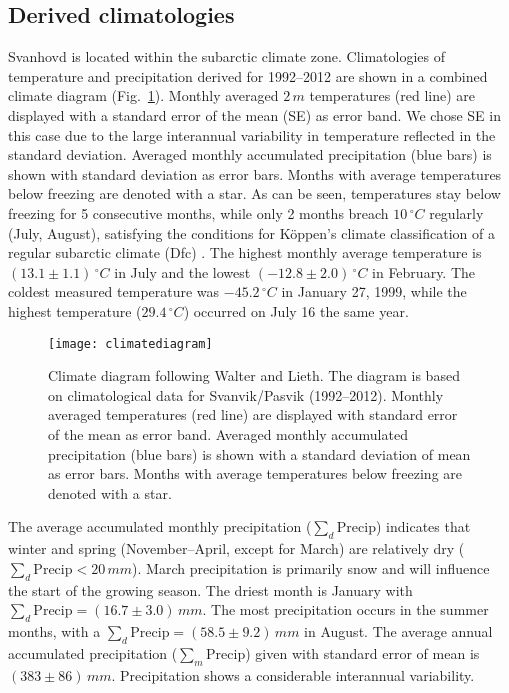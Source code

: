 \documentclass[bg, manuscript]{copernicus}
\begin{document}
\subsection{Derived climatologies}
\label{subsec:climatologies}

Svanhovd is located within the subarctic climate zone. Climatologies of temperature and precipitation derived for 1992--2012 are shown in a combined climate diagram (Fig.~\ref{fig:climatediagram}). Monthly averaged $2\,\unit{m}$ temperatures (red line) are displayed with a standard error of the mean (SE) as error band. We chose SE in this case due to the large interannual variability in temperature reflected in the standard deviation. Averaged monthly accumulated precipitation (blue bars) is shown with standard deviation as error bars. Months with average temperatures below freezing are denoted with a star. As can be seen, temperatures stay below freezing for 5 consecutive months, while only 2 months breach $10\,\unit{^\circ C}$ regularly (July, August), satisfying the conditions for K\"{o}ppen's climate classification of a regular subarctic climate (Dfc) \citep[e.g.][]{SD:Beck2018}. The highest monthly average temperature is $(13.1\pm 1.1)\,\unit{^\circ C}$ in July and the lowest $(-12.8\pm 2.0)\,\unit{^\circ C}$ in February. The coldest measured temperature was $-45.2\,\unit{^\circ C}$ in January 27, 1999, while the highest temperature ($29.4\,\unit{^\circ C}$) occurred on July 16 the same year.

\begin{figure}[t]
  \texttt{[image: climatediagram]}
  \caption{Climate diagram following Walter and Lieth. The diagram is based on climatological data for Svanvik/Pasvik (1992--2012). Monthly averaged temperatures (red line) are displayed with standard error of the mean as error band. Averaged monthly accumulated precipitation (blue bars) is shown with a standard deviation of mean as error bars. Months with average temperatures below freezing are denoted with a star.}
  \label{fig:climatediagram}
\end{figure}

The average accumulated monthly precipitation ($\sum_d\mathrm{Precip}$) indicates that winter and spring (November--April, except for March) are relatively dry ($\sum_d\mathrm{Precip} < 20\,\unit{mm}$). March precipitation is primarily snow and will influence the start of the growing season. The driest month is January with $\sum_d\mathrm{Precip} = (16.7\pm 3.0)\,\unit{mm}$. The most precipitation occurs in the summer months, with a $\sum_d\mathrm{Precip} = (58.5\pm 9.2)\,\unit{mm}$ in August. The average annual accumulated precipitation ($\sum_m\mathrm{Precip}$) given with standard error of mean is $(383\pm 86)\,\unit{mm}$. Precipitation shows a considerable interannual variability.
\end{document}
